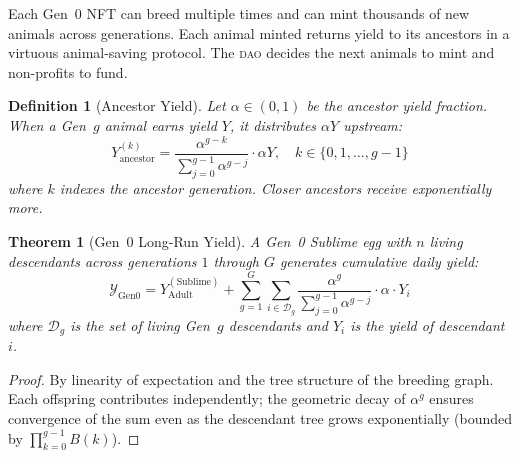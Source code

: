 \documentclass[11pt,letterpaper]{article}
\newtheorem{theorem}{Theorem}[section]
\newtheorem{definition}{Definition}[section]
\newcommand{\DAO}{\textsc{dao}}
\begin{document}
Each Gen~0 NFT can breed multiple times and can mint thousands of new animals across generations.  Each animal minted returns yield to its ancestors in a virtuous animal-saving protocol.  The \DAO{} decides the next animals to mint and non-profits to fund.

\begin{definition}[Ancestor Yield]
Let $\alpha \in (0, 1)$ be the ancestor yield fraction.  When a Gen~$g$ animal earns yield $Y$, it distributes $\alpha Y$ upstream:
\begin{equation}
Y_{\text{ancestor}}^{(k)} = \frac{\alpha^{g-k}}{\sum_{j=0}^{g-1} \alpha^{g-j}} \cdot \alpha Y, \quad k \in \{0, 1, \ldots, g-1\}
\label{eq:ancestor-yield}
\end{equation}
where $k$ indexes the ancestor generation.  Closer ancestors receive exponentially more.
\end{definition}

\begin{theorem}[Gen~0 Long-Run Yield]
A Gen~0 Sublime egg with $n$ living descendants across generations $1$ through $G$ generates cumulative daily yield:
\begin{equation}
\mathcal{Y}_{\text{Gen0}} = Y_{\text{Adult}}^{(\text{Sublime})} + \sum_{g=1}^{G} \sum_{i \in \mathcal{D}_g} \frac{\alpha^g}{\sum_{j=0}^{g-1}\alpha^{g-j}} \cdot \alpha \cdot Y_i
\label{eq:gen0-longrun}
\end{equation}
where $\mathcal{D}_g$ is the set of living Gen~$g$ descendants and $Y_i$ is the yield of descendant $i$.
\end{theorem}

\begin{proof}
By linearity of expectation and the tree structure of the breeding graph.  Each offspring contributes independently; the geometric decay of $\alpha^g$ ensures convergence of the sum even as the descendant tree grows exponentially (bounded by $\prod_{k=0}^{g-1} B(k)$).
\end{proof}
\end{document}
